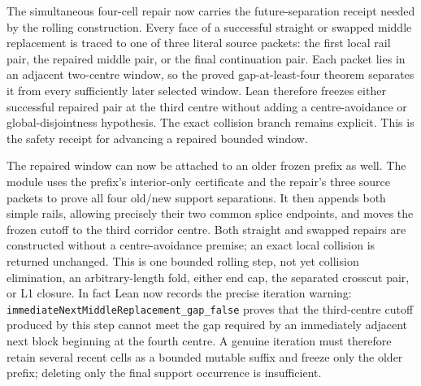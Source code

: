 \documentclass[11pt]{article}
\theoremstyle{definition}
\begin{document}
The simultaneous four-cell repair now carries the future-separation receipt
needed by the rolling construction.  Every face of a successful straight or
swapped middle replacement is traced to one of three literal source packets:
the first local rail pair, the repaired middle pair, or the final continuation
pair.  Each packet lies in an adjacent two-centre window, so the proved
gap-at-least-four theorem separates it from every sufficiently later selected
window.  Lean therefore freezes either successful repaired pair at the third
centre without adding a centre-avoidance or global-disjointness hypothesis.
The exact collision branch remains explicit.  This is the safety receipt for
advancing a repaired bounded window.

The repaired window can now be attached to an older frozen prefix as well.
The module
uses the prefix's interior-only certificate and the repair's three source
packets to prove all four old/new support separations.  It then appends both
simple rails, allowing precisely their two common splice endpoints, and moves
the frozen cutoff to the third corridor centre.  Both straight and swapped
repairs are constructed without a centre-avoidance premise; an exact local
collision is returned unchanged.  This is one bounded rolling step, not yet
collision elimination, an arbitrary-length fold, either end cap, the
separated crosscut pair, or L1 closure.  In fact Lean now records the precise
iteration warning:
\texttt{immediateNextMiddleReplacement\_gap\_false} proves that the
third-centre cutoff produced by this step cannot meet the gap required by an
immediately adjacent next block beginning at the fourth centre.  A genuine
iteration must therefore retain several recent cells as a bounded mutable
suffix and freeze only the older prefix; deleting only the final support
occurrence is insufficient.
\end{document}
